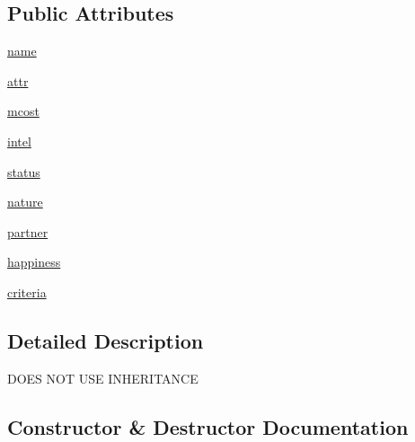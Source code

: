 \subsection*{Public Attributes}
\begin{DoxyCompactItemize}
\item 
\hyperlink{classgirls_1_1girl__uninherited_1_1_girl_a17de9450938ef15ad772de7a1acfc197}{name}
\item 
\hyperlink{classgirls_1_1girl__uninherited_1_1_girl_a3f915cb51744e34e3d2f88624b402148}{attr}
\item 
\hyperlink{classgirls_1_1girl__uninherited_1_1_girl_a6a34ca1b5efd14cc0c70e2a0bd0202dc}{mcost}
\item 
\hyperlink{classgirls_1_1girl__uninherited_1_1_girl_a820d0a86b6f84b7d3fc75d142cdedfdc}{intel}
\item 
\hyperlink{classgirls_1_1girl__uninherited_1_1_girl_afe707a9b1349debe5d388105fdfa73c6}{status}
\item 
\hyperlink{classgirls_1_1girl__uninherited_1_1_girl_af4b8bfdd9e572a69ce4f5bd047fe4aad}{nature}
\item 
\hyperlink{classgirls_1_1girl__uninherited_1_1_girl_ab24240732eeb6eff5749572e45cb9b97}{partner}
\item 
\hyperlink{classgirls_1_1girl__uninherited_1_1_girl_a41b3e929e26dd04da47f42022436afd4}{happiness}
\item 
\hyperlink{classgirls_1_1girl__uninherited_1_1_girl_a35076aa934b12cc39ae778cf0bb176c9}{criteria}
\end{DoxyCompactItemize}


\subsection{Detailed Description}
\begin{DoxyVerb}DOES NOT USE INHERITANCE\end{DoxyVerb}
 

\subsection{Constructor \& Destructor Documentation}

